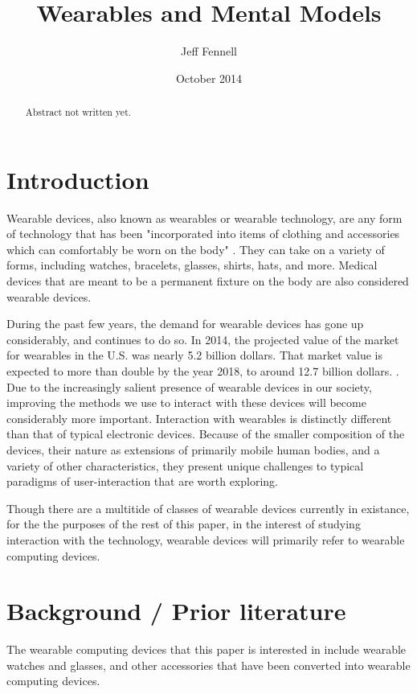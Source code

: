 \documentclass[12pt]{article}
\begin{document}
\begin{abstract}
Abstract not written yet.

\end{abstract}

\title{Wearables and Mental Models}
\author{Jeff Fennell}
\date{October 2014}
\maketitle

\tableofcontents

\section{Introduction}
Wearable devices, also known as wearables or wearable technology, are any form of technology that has been "incorporated into items of clothing and accessories which can comfortably be worn on the body" \cite{wd}. They can take on a variety of forms, including watches, bracelets, glasses, shirts, hats, and more. Medical devices that are meant to be a permanent fixture on the body are also considered wearable devices.

During the past few years, the demand for wearable devices has gone up considerably, and continues to do so. In 2014, the projected value of the market for wearables in the U.S. was nearly 5.2 billion dollars. That market value is expected to more than double by the year 2018, to around 12.7 billion dollars. \cite{wmv}. Due to the increasingly salient presence of wearable devices in our society, improving the methods we use to interact with these devices will become considerably more important. Interaction with wearables is distinctly different than that of typical electronic devices.  Because of the smaller composition of the devices, their nature as extensions of primarily mobile human bodies, and a variety of other characteristics, they present unique challenges to typical paradigms of user-interaction that are worth exploring.

Though there are a multitide of classes of wearable devices currently in existance, for the the purposes of the rest of this paper, in the interest of studying interaction with the technology, wearable devices will primarily refer to wearable computing devices.

\section{Background / Prior literature}
The wearable computing devices that this paper is interested in include wearable watches and glasses, and other accessories that have been converted into wearable computing devices.
\end{document}
